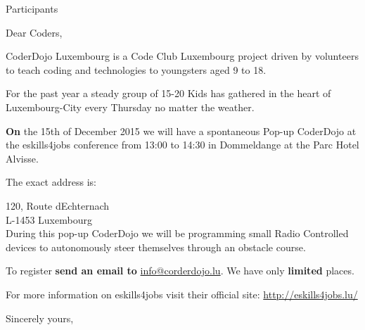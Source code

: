 \documentclass[DIN, pagenumber=false, parskip=half, fromalign=right, fromrule=false,fromlogo]{scrlttr2}
\begin{document}
 
\begin{letter}{ Participants}

\opening{Dear Coders,}

CoderDojo Luxembourg is a Code Club Luxembourg project driven by volunteers to teach coding and technologies to youngsters aged 9 to 18.

For the past year a steady group of 15-20 Kids has gathered in the heart of Luxembourg-City every Thursday no matter the weather. 

\textbf{On} the 15th of December 2015 we will have a spontaneous Pop-up CoderDojo at the eskills4jobs conference from 13:00 to 14:30 in Dommeldange at the Parc Hotel Alvisse.

The exact address is:

120, Route d{\textquotesingle}Echternach \\
L-1453 Luxembourg \\

During this pop-up CoderDojo we will be programming small Radio Controlled devices to autonomously steer themselves through an obstacle course. 

To register \textbf{send an email to} \url{info@corderdojo.lu}. We have only \textbf{limited} places.

For more information on eskills4jobs visit their official site: \url{http://eskills4jobs.lu/}

\closing{Sincerely yours,}

\end{letter}
\end{document}
